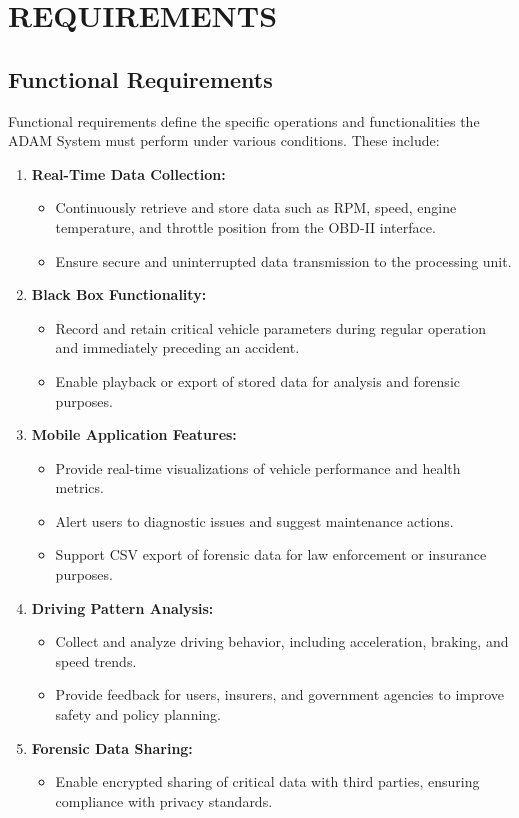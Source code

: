 \chapter{REQUIREMENTS}
\justify

\section{Functional Requirements}
Functional requirements define the specific operations and functionalities the ADAM System must perform under various conditions. These include:

\begin{enumerate}
    \item \textbf{Real-Time Data Collection:}
    \begin{itemize}
        \item Continuously retrieve and store data such as RPM, speed, engine temperature, and throttle position from the OBD-II interface.
        \item Ensure secure and uninterrupted data transmission to the processing unit.
    \end{itemize}

    \item \textbf{Black Box Functionality:}
    \begin{itemize}
        \item Record and retain critical vehicle parameters during regular operation and immediately preceding an accident.
        \item Enable playback or export of stored data for analysis and forensic purposes.
    \end{itemize}
    \item \textbf{Mobile Application Features:}
    \begin{itemize}
        \item Provide real-time visualizations of vehicle performance and health metrics.
        \item Alert users to diagnostic issues and suggest maintenance actions.
        \item Support CSV export of forensic data for law enforcement or insurance purposes.
    \end{itemize}
    \item \textbf{Driving Pattern Analysis:}
    \begin{itemize}
        \item Collect and analyze driving behavior, including acceleration, braking, and speed trends.
        \item Provide feedback for users, insurers, and government agencies to improve safety and policy planning.
    \end{itemize}
    \item \textbf{Forensic Data Sharing:}
    \begin{itemize}
        \item Enable encrypted sharing of critical data with third parties, ensuring compliance with privacy standards.
    \end{itemize}
\end{enumerate}

